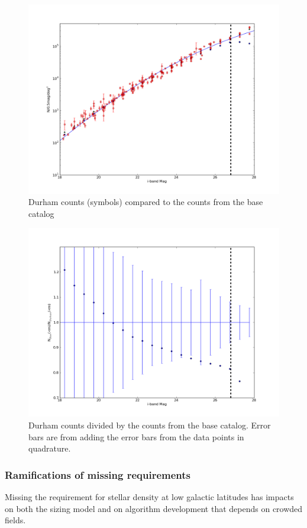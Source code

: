 \documentclass[]{article}
\begin{document}
\begin{figure}
\centering
\includegraphics[width=5in]{validation_figures/Ngals-i.png}
\caption{Durham counts (symbols) compared to the counts from the base catalog \label{fig:gcounts}}
\end{figure}
\begin{figure}
\centering
\includegraphics[width=5in]{validation_figures/CumulativeFraction_i.png}
\caption{Durham counts divided by the counts from the base catalog.  Error bars are from adding the error bars from the data points in quadrature. \label{fig:gratio}}
\end{figure}

\subsubsection{Ramifications of missing requirements}
Missing the requirement for stellar density at low galactic latitudes has impacts on both the sizing model and
on algorithm development that depends on crowded fields.  
\end{document}
